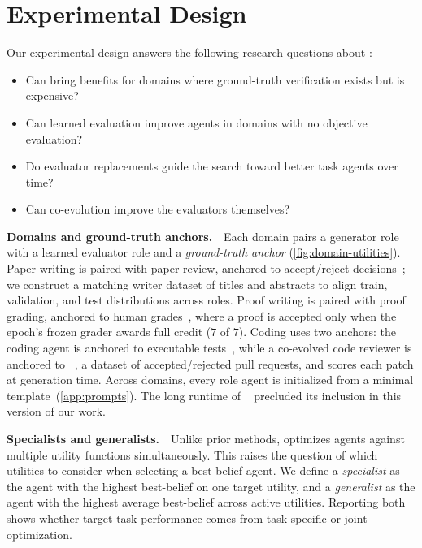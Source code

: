 \section{Experimental Design}
\label{sec:experimental-design}

Our experimental design answers the following research questions about \ourmethod:
\begin{itemize}[noitemsep,topsep=1pt,parsep=2pt,partopsep=0pt,leftmargin=2.5em]
    \item[\textbf{RQ1}] Can \ourmethod bring benefits for domains where ground-truth verification exists but is expensive?
    \item[\textbf{RQ2}] Can learned evaluation improve agents in domains with no objective evaluation?

    \item[\textbf{RQ3}] Do evaluator replacements guide the search toward better task agents over time?
    \item[\textbf{RQ4}] Can co-evolution improve the evaluators themselves?
 
\end{itemize}



\noindent\textbf{Domains and ground-truth anchors.}~~Each domain pairs a generator role with a learned evaluator role and a \emph{ground-truth anchor} (\cref{fig:domain-utilities}). Paper writing is paired with paper review,  anchored to \apres accept/reject decisions~\citep{zhao2026apres}; we construct a matching writer dataset of \apres titles and abstracts to align train, validation, and test distributions across roles. Proof writing is paired with  proof grading, anchored to \imogradbench human grades~\citep{luong2025towards}, where a proof is accepted only when the epoch's frozen grader awards full credit ($7$ of $7$). Coding uses two anchors: the coding agent is anchored to executable \polyglot tests~\citep{gauthier2024polyglot}, while a co-evolved code reviewer is anchored to \crave~\citep{zhang2025crave}, a dataset of accepted/rejected pull requests, and scores each \polyglot patch at generation time.  Across domains, every role agent is initialized from a minimal template~(\cref{app:prompts}). The long runtime of \swebench~\citep{jimenez2024swebench} precluded its inclusion in this version of our work.

\noindent\textbf{Specialists and generalists.}~~Unlike prior methods, \ourmethod optimizes agents against multiple utility functions simultaneously. This raises the question of which utilities to consider when selecting a best-belief agent. We define a \emph{specialist} as the agent with the highest best-belief on one target utility, and a \emph{generalist} as the agent with the highest average best-belief across active utilities. Reporting both shows whether target-task performance comes from task-specific or joint optimization.

